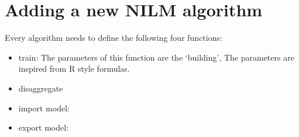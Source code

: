 \documentclass{sig-alternate}
\begin{document}
\section{Adding a new NILM algorithm}
Every algorithm needs to define the following four functions:
\begin{itemize}
\item train: The parameters of this function are the `building',
The parameters are inspired from R style formulas.
\item disaggregate
\item import model: 
\item export model:
\end{itemize}






\end{document}
